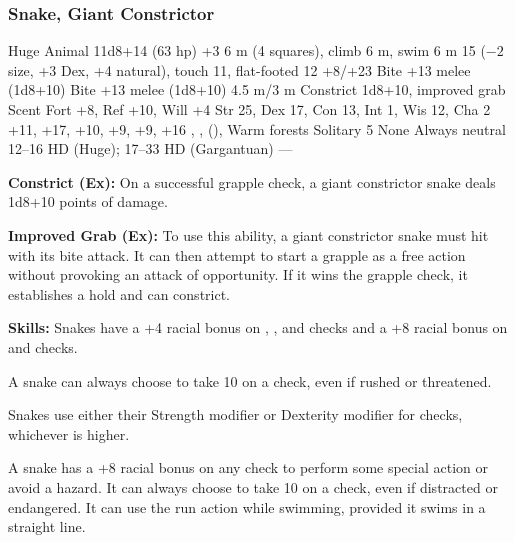 \subsubsection{Snake, Giant Constrictor}
\begin{MonsterStats}
{Huge Animal}
{11d8+14 (63 hp)}
{+3}
{6 m (4 squares), climb 6 m, swim 6 m}
{15 ($-2$ size, +3 Dex, +4 natural), touch 11, flat-footed 12}
{+8/+23}
{Bite +13 melee (1d8+10)}
{Bite +13 melee (1d8+10)}
{4.5 m/3 m}
{Constrict 1d8+10, improved grab}
{Scent}
{Fort +8, Ref +10, Will +4}
{Str 25, Dex 17, Con 13, Int 1, Wis 12, Cha 2}
{ +11,  +17,  +10,  +9,  +9,  +16}
{, ,  (), }
{Warm forests}
{Solitary}
{5}
{None}
{Always neutral}
{12--16 HD (Huge); 17--33 HD (Gargantuan)}
{---}
\end{MonsterStats}

\textbf{Constrict (Ex):} On a successful grapple check, a giant constrictor snake deals 1d8+10 points of damage.

\textbf{Improved Grab (Ex):} To use this ability, a giant constrictor snake must hit with its bite attack. It can then attempt to start a grapple as a free action without provoking an attack of opportunity. If it wins the grapple check, it establishes a hold and can constrict.

\textbf{Skills:} Snakes have a +4 racial bonus on , , and  checks and a +8 racial bonus on  and  checks.

A snake can always choose to take 10 on a  check, even if rushed or threatened.

Snakes use either their Strength modifier or Dexterity modifier for  checks, whichever is higher.

A snake has a +8 racial bonus on any  check to perform some special action or avoid a hazard. It can always choose to take 10 on a  check, even if distracted or endangered. It can use the run action while swimming, provided it swims in a straight line.
